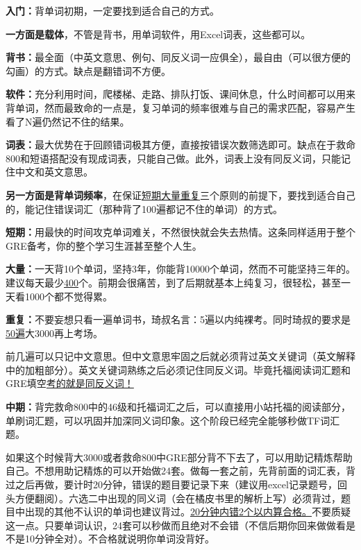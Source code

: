 \documentclass[cn,plain]{./src/qyxfbook}
\newcommand{\red}[1]{\textcolor[rgb]{1,0,0}{#1}}
\begin{document}
				
				\textbf{入门：}背单词初期，一定要找到适合自己的方式。\par
				\textbf{一方面是载体}，不管是背书，用单词软件，用Excel词表，这些都可以。\par
				\textbf{背书：}最全面（中英文意思、例句、同反义词一应俱全），最自由（可以很方便的勾画）的方式。缺点是翻错词不方便。\par
				\textbf{软件：}充分利用时间，爬楼梯、走路、排队打饭、课间休息，什么时间都可以用来背单词，然而最致命的一点是，复习单词的频率很难与自己的需求匹配，容易产生看了N遍仍然记不住的结果。\par
				\textbf{词表：}最大优势在于回顾错词极其方便，直接按错误次数筛选即可。缺点在于救命800和短语搭配没有现成词表，只能自己做。此外，词表上没有同反义词，只能记住中文和英文意思。\par
				\textbf{另一方面是背单词频率}，在保证\red{\underline{短期大量重复}}三个原则的前提下，要找到适合自己的，能记住错误词汇（那种背了100遍都记不住的单词）的方式。\par
				\textbf{短期：}用最快的时间攻克单词难关，不然很快就会失去热情。这条同样适用于整个GRE备考，你的整个学习生涯甚至整个人生。\par
				\textbf{大量：}一天背10个单词，坚持3年，你能背10000个单词，然而不可能坚持三年的。建议每天最少\red{\underline{400}}个。前期会很痛苦，到了后期就基本上纯复习，很轻松，甚至一天看1000个都不觉得累。\par
				\textbf{重复：}不要妄想只看一遍单词书，琦叔名言：5遍以内纯裸考。同时琦叔的要求是\red{\underline{50遍}}大3000再上考场。\par
				前几遍可以只记中文意思。但中文意思牢固之后就必须背过英文关键词（英文解释中的加粗部分）。英文关键词熟练之后必须记住同反义词。毕竟托福阅读词汇题和GRE填空\red{\underline{考的就是同反义词！}}

				
				\textbf{中期：}背完救命800中的46级和托福词汇之后，可以直接用小站托福的阅读部分，单刷词汇题，可以巩固并加深同义词印象。这个阶段已经完全能够秒做TF词汇题。\par
				
				如果这个时候背大3000或者救命800中GRE部分背不下去了，可以用助记精炼帮助自己。不想用助记精炼的可以开始做24套。做每一套之前，先背前面的词汇表，背过之后再做，要计时20分钟，错误的题目要记录下来（建议用excel记录题号，回头方便翻阅）。六选二中出现的同义词（会在橘皮书里的解析上写）必须背过，题目中出现的其他不认识的单词也建议背过。\red{\underline{20分钟内错2个以内算合格。}}不要质疑这一点。只要单词认识，24套可以秒做而且绝对不会错（不信后期你回来做做看是不是10分钟全对）。不合格就说明你单词没背好。\par
				
\end{document}
